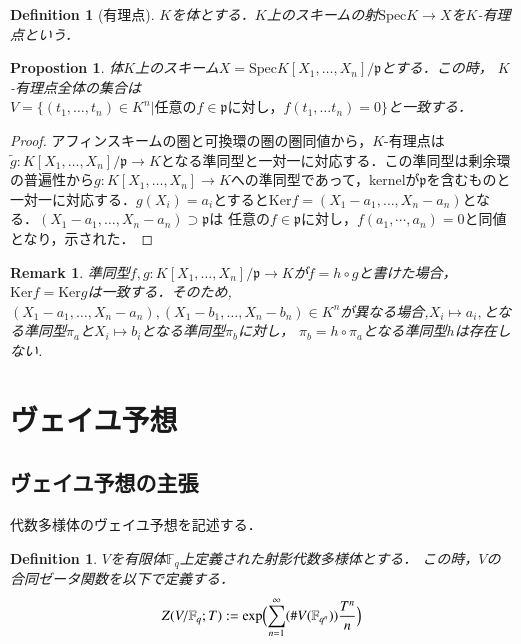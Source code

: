 \documentclass{ujarticle}
\newtheorem{dfn}[thm]{Definition}
\newtheorem{prop}[thm]{Propostion}
\newtheorem*{rem}{Remark}
\begin{document}
\begin{dfn}[有理点]
  $K$を体とする．$K$上のスキームの射$\mathrm{Spec}K \to X$を$K$-有理点という．
\end{dfn}
\begin{prop}
 体$K$上のスキーム$X=\mathrm{Spec}K[X_1,\dots,X_n]/\mathfrak{p}$とする．この時，
 $K$-有理点全体の集合は$V=\{(t_1,\dots,t_n) \in K^n | \mbox{任意の}f \in \mathfrak{p} \mbox{に対し，}f(t_1, \dots t_n)=0  \} $と一致する．
\end{prop}
\begin{proof}
アフィンスキームの圏と可換環の圏の圏同値から，$K$-有理点は$\tilde{g}:K[X_1,\dots,X_n]/\mathfrak{p} \to K$となる準同型と一対一に対応する．この準同型は剰余環の普遍性から$g:K[X_1,\dots,X_n] \to K$への準同型であって，kernelが$\mathfrak{p}$を含むものと一対一に対応する．$g(X_i)=a_i$とすると$\mathrm{Ker}f=(X_1 -a_1, \dots,X_n -a_n)$となる．$(X_1 -a_1, \dots,X_n -a_n) \supset \mathfrak{p}$は
任意の$f \in  \mathfrak{p}$に対し，$f(a_1,\cdots,a_n)=0$と同値となり，示された．
\end{proof}
\begin{rem}
 準同型$f,g: K[X_1,\dots,X_n]/\mathfrak{p} \to K$が$f=h \circ g$と書けた場合，$\mathrm{Ker}f = \mathrm{Ker}g$は一致する．そのため,$(X_1 - a_1,\dots,X_n - a_n),(X_1 - b_1,\dots,X_n - b_n) \in K^n$が異なる場合,$X_i \mapsto a_i,$となる準同型$\pi_a$と$X_i \mapsto b_i$となる準同型$\pi_b$に対し，
 $\pi_b = h \circ \pi_a$となる準同型$h$は存在しない.
\end{rem}

\section{ヴェイユ予想}
\label{sub:ヴェイユ予想}
\subsection{ヴェイユ予想の主張}
\label{subs:ゼータ関数とヴェイユ予想}

代数多様体のヴェイユ予想を記述する．
\begin{dfn}
    $V$を有限体$\mathbb{F}_q$上定義された射影代数多様体とする．
    この時，$V$の合同ゼータ関数を以下で定義する．
    \begin{equation*}
     Z(V/\mathbb{F}_q;T):= \mathrm{exp}\Bigl( \sum_{n=1}^{\infty}(\#V(\mathbb{F}_{q^n}))\frac{T^n}{n} \Bigr)
    \end{equation*}
\end{dfn}
\end{document}

